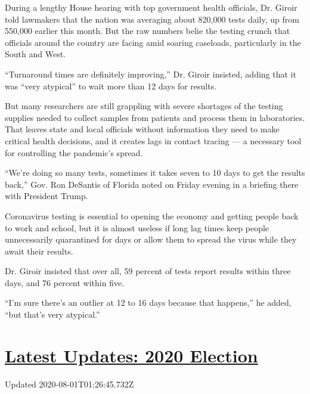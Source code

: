During a lengthy House hearing with top government health officials, Dr.
Giroir told lawmakers that the nation was averaging about 820,000 tests
daily, up from 550,000 earlier this month. But the raw numbers belie the
testing crunch that officials around the country are facing amid soaring
caseloads, particularly in the South and West.

``Turnaround times are definitely improving,'' Dr. Giroir insisted,
adding that it was ``very atypical'' to wait more than 12 days for
results.

But many researchers are still grappling with severe shortages of the
testing supplies needed to collect samples from patients and process
them in laboratories. That leaves state and local officials without
information they need to make critical health decisions, and it creates
lags in contact tracing --- a necessary tool for controlling the
pandemic's spread.

``We're doing so many tests, sometimes it takes seven to 10 days to get
the results back,'' Gov. Ron DeSantis of Florida noted on Friday evening
in a briefing there with President Trump.

Coronavirus testing is essential to opening the economy and getting
people back to work and school, but it is almost useless if long lag
times keep people unnecessarily quarantined for days or allow them to
spread the virus while they await their results.

Dr. Giroir insisted that over all, 59 percent of tests report results
within three days, and 76 percent within five.

``I'm sure there's an outlier at 12 to 16 days because that happens,''
he added, ``but that's very atypical.''

\hypertarget{latest-updates-2020-election}{%
\section{\texorpdfstring{\href{https://www.nytimes.com/2020/07/31/us/elections/biden-vs-trump.html?action=click\&pgtype=Article\&state=default\&region=MAIN_CONTENT_1\&context=storylines_live_updates}{Latest
Updates: 2020
Election}}{Latest Updates: 2020 Election}}\label{latest-updates-2020-election}}

Updated 2020-08-01T01:26:45.732Z

